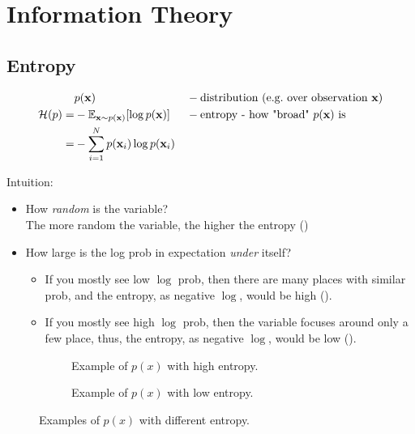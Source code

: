 \chapter{Information Theory}
\label{cha:information-theory}

\section{Entropy}
\begin{align}
	&p(\textbf{x}) &&-\text{distribution (\eg over observation $\textbf{x}$)}\\
	\mathcal{H}(p) =& -\mathbb{E}_{\textbf{x}\sim p(\textbf{x})} [\log p(\textbf{x})] &&-\text{entropy - how "broad" $p(\textbf{x})$ is}\\
	=& - \sum_{i=1}^{N} p(\textbf{x}_i) \log p(\textbf{x}_i)
\end{align}

Intuition:
\begin{itemize}
	\item How \textit{random} is the variable?\\
	The more random the variable, the higher the entropy ()
	\item How large is the log \ac{prob} in expectation \textit{under} itself?
	\begin{itemize}
		\item If you mostly see low $\log$ \ac{prob}, then there are many places with similar \ac{prob}, and the entropy, as negative $\log$, would be high ().
		\item If you mostly see high $\log$ \ac{prob}, then the variable focuses around only a few place, thus, the entropy, as negative $\log$, would be low ().
	\end{itemize}	
\end{itemize}

\begin{figure}[hbt!]
	\centering
	\begin{subfigure}[b]{0.45\textwidth}
		\centering
		\caption{Example of $p(x)$ with high entropy.}
		\label{fig:entropy-high}
	\end{subfigure}
	\hfill
	\begin{subfigure}[b]{0.45\textwidth}
		\centering
		\caption{Example of $p(x)$ with low entropy.}
		\label{fig:entropy-low}
	\end{subfigure}
	\caption{Examples of $p(x)$ with different entropy.}
	\label{fig:entropy}
\end{figure}

